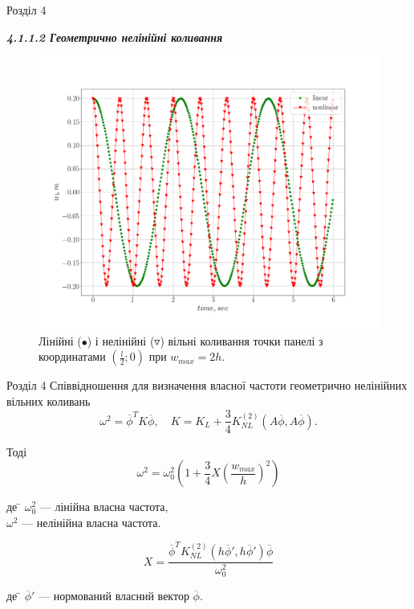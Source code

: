 \documentclass[8pt]{beamer}
\numberwithin{figure}{section}
\numberwithin{equation}{section}
\numberwithin{table}{section}
\begin{document}
\begin{frame}{Розділ 4}

\textbf{\textit{4.1.1.2 Геометрично нелінійні коливання}}
\begin{figure}
	\includegraphics[scale=0.2]{pic/lin_nonlin_time_w2h.png}
		\caption{Лінійні ($\bullet $) і нелінійні ($ \triangledown $) вільні коливання точки панелі з координатами $(\frac{l}{2};0)$ при $w_{max}=2h$.}
		\label{fig:nonlin_time}
\end{figure}

\end{frame}

\begin{frame}{Розділ 4}
Співвідношення для визначення власної частоти геометрично нелінійних вільних коливань
\begin{equation}
\omega^2=\overline{\phi}^T K \overline{\phi}, \quad K = K_L + \frac34 K_{NL}^{(2)}\left( A\overline{\phi},A\overline{\phi} \right).
\end{equation}

Тоді
\begin{equation}
\omega^2=\omega_0^2\left(1+\frac{3}{4}X\left(\frac{w_{max}}{h}\right)^2\right)
\end{equation}

\begin{tabbing}
де \= $\omega_0^2$ --- лінійна власна частота,\\
\> $\omega^2$ --- нелінійна власна частота.
\end{tabbing}

\begin{equation}
X=\frac{\overline{\phi}^T K_{NL}^{(2)}\left( h\overline{\phi}',h\overline{\phi}' \right) \overline{\phi}}{\omega_0^2}
\end{equation}

\begin{tabbing}
де \= $\overline{\phi}'$ --- нормований власний вектор $\overline{\phi}$.
\end{tabbing}


\end{frame}
\end{document}
